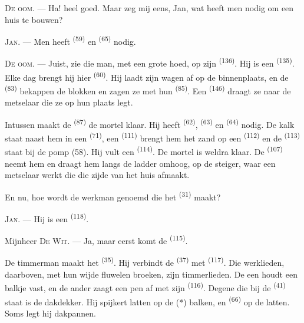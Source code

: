 \VUsaut{3.0mm}
\VUsaut{3.0mm}

\textsc{De oom}. --- Ha! heel goed. Maar zeg mij eens, Jan, wat heeft men nodig om een huis te
bouwen?

\textsc{Jan}. --- Men heeft  \textsuperscript{(59)} en
 \textsuperscript{(65)} nodig.

\textsc{De oom}. --- Juist, zie die man, met een grote hoed, op zijn
 \textsuperscript{(136)}. Hij is een 
\textsuperscript{(135)}. Elke dag brengt hij hier 
\textsuperscript{(60)}. Hij laadt zijn wagen af op de binnenplaats, en de
 \textsuperscript{(83)} bekappen de blokken en zagen ze met
hun  \textsuperscript{(85)}. Een  \textsuperscript{(146)}
draagt ze naar de metselaar die ze op hun plaats legt.

Intussen maakt de  \textsuperscript{(87)} de mortel klaar. Hij heeft
 \textsuperscript{(62)},  \textsuperscript{(63)} en 
\textsuperscript{(64)} nodig. De kalk staat naast hem in een 
\textsuperscript{(71)}, een
 \textsuperscript{(111)} brengt hem het zand op een
 \textsuperscript{(112)} en de 
\textsuperscript{(113)} staat bij de pomp (58). Hij vult een 
\textsuperscript{(114)}. De mortel is weldra klaar. De 
\textsuperscript{(107)} neemt hem en draagt hem langs de ladder omhoog, op de steiger, waar
een metselaar werkt die die zijde van het huis afmaakt.

En nu, hoe wordt de werkman genoemd die het  \textsuperscript{(31)} maakt?

\textsc{Jan}. --- Hij is een  \textsuperscript{(118)}.

\VUsaut{3.0mm}
\VUsaut{3.0mm}

Mijnheer \textsc{De Wit}. --- Ja, maar eerst komt de 
\textsuperscript{(115)}.

De timmerman maakt het  \textsuperscript{(35)}. Hij verbindt de
 \textsuperscript{(37)} met  \textsuperscript{(117)}. Die
werklieden, daarboven, met hun wijde fluwelen broeken, zijn timmerlieden. De een houdt een
balkje vast, en de ander zaagt een pen af met zijn  \textsuperscript{(116)}.
Degene die bij de
 \textsuperscript{(41)} staat is de dakdekker. Hij spijkert
latten op de (*) balken, en  \textsuperscript{(66)} op de latten. Soms legt hij
dakpannen.

